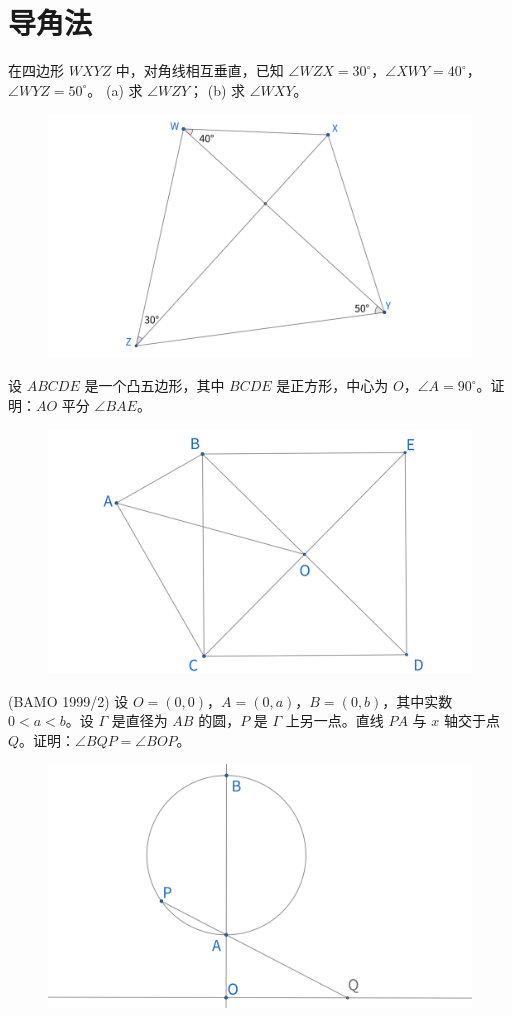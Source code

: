\part{导角法}

\begin{exercise}
在四边形 $WXYZ$ 中，对角线相互垂直，已知 $\angle WZX = 30^\circ$，$\angle XWY = 40^\circ$，$\angle WYZ = 50^\circ$。
(a) 求 $\angle WZY$；
(b) 求 $\angle WXY$。
\end{exercise}
\begin{figure}[H]
    \centering
    \includegraphics[width=0.7\linewidth]{figures/exercises/001.png}
\end{figure}

\begin{exercise}
设 $ABCDE$ 是一个凸五边形，其中 $BCDE$ 是正方形，中心为 $O$，$\angle A = 90^\circ$。证明：$AO$ 平分 $\angle BAE$。
\end{exercise}
\begin{figure}[H]
    \centering
    \includegraphics[width=0.7\linewidth]{figures/exercises/002.png}
\end{figure}

\newpage 
\begin{exercise}
(BAMO 1999/2) 设 $O = (0, 0)$，$A = (0, a)$，$B = (0, b)$，其中实数 $0 < a < b$。设 $\Gamma$ 是直径为 ${AB}$ 的圆，$P$ 是 $\Gamma$ 上另一点。直线 $PA$ 与 $x$ 轴交于点 $Q$。证明：$\angle BQP = \angle BOP$。
\end{exercise}
\begin{figure}[H]
    \centering
    \includegraphics[width=0.7\linewidth]{figures/exercises/003.png}
\end{figure}


